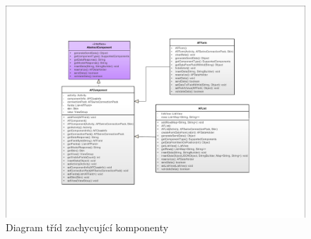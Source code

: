 \begin{figure}
\begin{center}
\includegraphics[width=\textwidth, angle=270]{figures/classDiagramComponents}
\caption{Diagram tříd zachycující komponenty}
\label{img:classDiagramComponents}
\end{center}
\end{figure}

